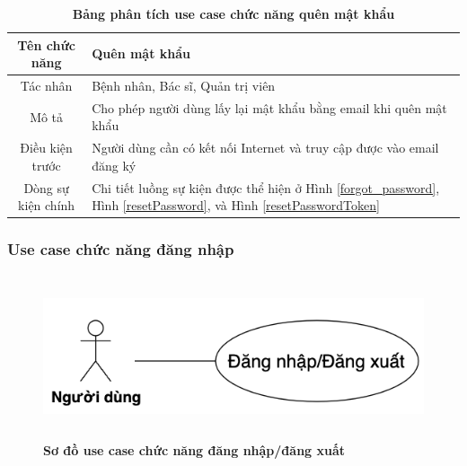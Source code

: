   \begin{table}[H]
    \caption{\bfseries \fontsize{12pt}{0pt}\selectfont Bảng phân tích use case chức năng quên mật khẩu}
    \centering
    \begin{tabularx}{0.9\textwidth}{|c|X|}
      \hline
      \textbf{Tên chức năng} & \textbf{Quên mật khẩu} \\
      \hline
      Tác nhân & Bệnh nhân, Bác sĩ, Quản trị viên \\
      \hline
      Mô tả & Cho phép người dùng lấy lại mật khẩu bằng email khi quên mật khẩu \\
      \hline
      Điều kiện trước & Người dùng cần có kết nối Internet và truy cập được vào email đăng ký \\
      \hline
      Dòng sự kiện chính & 
        Chi tiết luồng sự kiện được thể hiện ở Hình \ref{forgot_password}, Hình \ref{resetPassword}, và Hình \ref{resetPasswordToken}\\
      \hline
    \end{tabularx}
  \end{table}

\subsubsection{Use case chức năng đăng nhập}
  \begin{figure}[H]
    \centering
    \includegraphics[width=12cm,height=4.8cm]{Images/use_case/use_case_login.png}
    \caption[Sơ đồ use case chức năng đăng nhập/đăng xuất]{\bfseries \fontsize{12pt}{0pt}
    \selectfont Sơ đồ use case chức năng đăng nhập/đăng xuất}
    \label{use_case_login} %
  \end{figure}

